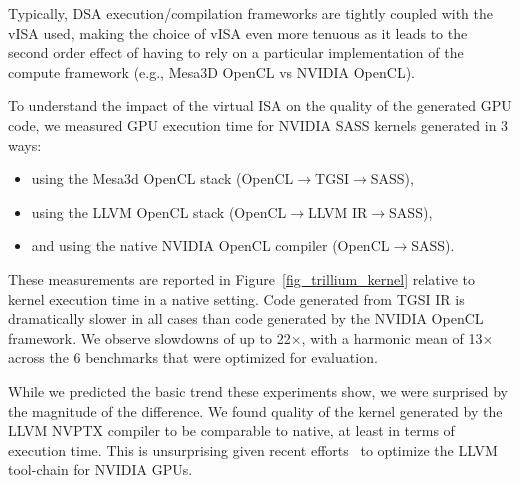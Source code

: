 Typically, DSA execution/compilation frameworks are tightly coupled with the
vISA used, making the choice of vISA even more tenuous as it leads to the
second order effect of having to rely on a particular implementation of the
compute framework (e.g., Mesa3D OpenCL vs NVIDIA OpenCL).

To understand the impact of the virtual ISA on the quality of the generated
GPU code, we measured GPU execution time for NVIDIA SASS kernels generated in
3 ways:
\begin{itemize}[nosep, topsep=0em, leftmargin=1em,labelwidth=*,align=left]
\item using the Mesa3d OpenCL stack (OpenCL$\rightarrow{}$TGSI$\rightarrow{}$SASS),
\item using the LLVM OpenCL stack (OpenCL$\rightarrow{}$LLVM IR$\rightarrow{}$SASS),
\item and using the native NVIDIA OpenCL compiler (OpenCL$\rightarrow{}$SASS).
\end{itemize}

These measurements are reported in Figure~\ref{fig_trillium_kernel}
relative to kernel execution time in a native setting. Code generated from
TGSI IR is dramatically slower in all cases than code generated by the NVIDIA
OpenCL framework. We observe slowdowns of up to 22$\times$, with a harmonic
mean of 13$\times$ across the 6 benchmarks that were optimized for evaluation.

While we predicted the basic trend these experiments show, we were surprised
by the magnitude of the difference. We found quality of the kernel generated
by the LLVM NVPTX compiler to be comparable to native, at least in terms of
execution time. This is unsurprising given recent efforts~\cite{gpucc} to
optimize the LLVM tool-chain for NVIDIA GPUs.